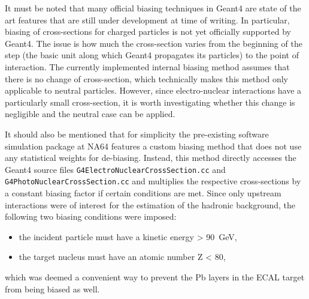 It must be noted that many official biasing techniques in Geant4 are state of the art features that are still under development at time of writing. In particular, biasing of cross-sections for charged particles is not yet officially supported by Geant4. The issue is how much the cross-section varies from the beginning of the step (the basic unit along which Geant4 propagates its particles) to the point of interaction. The currently implemented internal biasing method assumes that there is no change of cross-section, which technically makes this method only applicable to neutral particles. However, since electro-nuclear interactions have a particularly small cross-section, it is worth investigating whether this change is negligible and the neutral case can be applied.

It should also be mentioned that for simplicity the pre-existing software simulation package at NA64 features a custom biasing method that does not use any statistical weights for de-biasing. Instead, this method directly accesses the Geant4 source files \verb|G4ElectroNuclearCrossSection.cc| and \verb|G4PhotoNuclearCrossSection.cc| and multiplies the respective cross-sections by a constant biasing factor if certain conditions are met. Since only upstream interactions were of interest for the estimation of the hadronic background, the following two biasing conditions were imposed:

\begin{itemize}
    \item the incident particle must have a kinetic energy > \SI{90}{\giga\electronvolt},
    \item the target nucleus must have an atomic number Z < 80,
\end{itemize}

\noindent which was deemed a convenient way to prevent the Pb layers in the ECAL target from being biased as well. 


